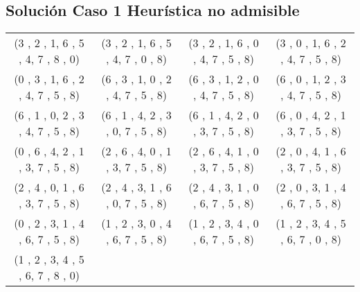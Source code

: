 \documentclass[11pt]{article}
\begin{document}
\subsection{Solución Caso 1 Heurística no admisible}
\begin{tabular}{c c c c}
(3 , 2 , 1,
6 , 5 , 4,
7 , 8 , 0)
&

(3 , 2 , 1,
6 , 5 , 4,
7 , 0 , 8)
&

(3 , 2 , 1,
6 , 0 , 4,
7 , 5 , 8)
&

(3 , 0 , 1,
6 , 2 , 4,
7 , 5 , 8)
\\

(0 , 3 , 1,
6 , 2 , 4,
7 , 5 , 8)
&

(6 , 3 , 1,
0 , 2 , 4,
7 , 5 , 8)
&

(6 , 3 , 1,
2 , 0 , 4,
7 , 5 , 8)
&

(6 , 0 , 1,
2 , 3 , 4,
7 , 5 , 8)
\\

(6 , 1 , 0,
2 , 3 , 4,
7 , 5 , 8)
&

(6 , 1 , 4,
2 , 3 , 0,
7 , 5 , 8)
&

(6 , 1 , 4,
2 , 0 , 3,
7 , 5 , 8)
&

(6 , 0 , 4,
2 , 1 , 3,
7 , 5 , 8)
\\

(0 , 6 , 4,
2 , 1 , 3,
7 , 5 , 8)
&

(2 , 6 , 4,
0 , 1 , 3,
7 , 5 , 8)
&

(2 , 6 , 4,
1 , 0 , 3,
7 , 5 , 8)
&

(2 , 0 , 4,
1 , 6 , 3,
7 , 5 , 8)
\\

(2 , 4 , 0,
1 , 6 , 3,
7 , 5 , 8)
&

(2 , 4 , 3,
1 , 6 , 0,
7 , 5 , 8)
&

(2 , 4 , 3,
1 , 0 , 6,
7 , 5 , 8)
&

(2 , 0 , 3,
1 , 4 , 6,
7 , 5 , 8)
\\

(0 , 2 , 3,
1 , 4 , 6,
7 , 5 , 8)
&

(1 , 2 , 3,
0 , 4 , 6,
7 , 5 , 8)
&

(1 , 2 , 3,
4 , 0 , 6,
7 , 5 , 8)
&

(1 , 2 , 3,
4 , 5 , 6,
7 , 0 , 8)
\\

(1 , 2 , 3,
4 , 5 , 6,
7 , 8 , 0)

&

&

&

\\
\end{tabular}
\clearpage
\end{document}
